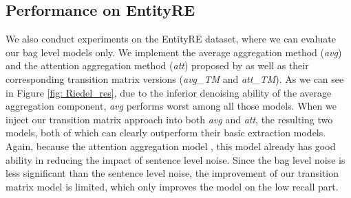 \subsection{Performance on EntityRE}
We also conduct experiments on the EntityRE dataset, where we can evaluate our bag level models only.  
We implement the average aggregation method (\emph{avg}) and the attention aggregation method (\emph{att}) proposed by \cite{lin2016neural} as well as their corresponding transition matrix versions (\emph{avg\_TM} and \emph{att\_TM}). As we can see in Figure \ref{fig: Riedel_res},  due to the inferior denoising ability of the average aggregation component, \emph{avg} performs worst among all those models. %
When we inject our transition matrix approach into both \emph{avg} and \emph{att}, the resulting two  models, both of which can  clearly outperform their basic extraction models.  
%
Again, because the attention aggregation model , this model already has good ability in reducing the impact of sentence level noise. Since the bag level noise is less significant than the sentence level noise, the improvement of our transition matrix model is limited, which only improves the model on the low recall part. 


